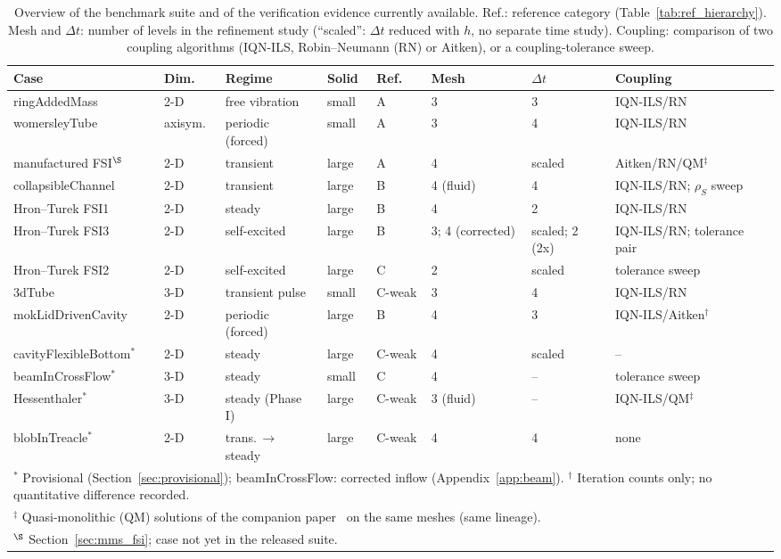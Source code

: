 \begin{table}[htbp]
	\centering
	\footnotesize
	\setlength{\tabcolsep}{3pt}
	\caption{Overview of the benchmark suite and of the verification evidence currently available. Ref.: reference category (Table~\ref{tab:ref_hierarchy}). Mesh and $\Delta t$: number of levels in the refinement study (``scaled'': $\Delta t$ reduced with $h$, no separate time study). Coupling: comparison of two coupling algorithms (IQN-ILS, Robin--Neumann (RN) or Aitken), or a coupling-tolerance sweep.}
	\label{tab:suite_overview}
	\begin{tabular}{llllllll}
		\toprule
		Case & Dim. & Regime & Solid & Ref. & Mesh & $\Delta t$ & Coupling \\
		\midrule
		ringAddedMass & 2-D & free vibration & small & A & 3 & 3 & IQN-ILS/RN \\
		womersleyTube & axisym. & periodic (forced) & small & A & 3 & 4 & IQN-ILS/RN \\
		manufactured FSI$^\S$ & 2-D & transient & large & A & 4 & scaled & Aitken/RN/QM$^\ddagger$ \\
		collapsibleChannel & 2-D & transient & large & B & 4 (fluid) & 4 & IQN-ILS/RN; $\rho_S$ sweep \\
		Hron--Turek FSI1 & 2-D & steady & large & B & 4 & 2 & IQN-ILS/RN \\
		Hron--Turek FSI3 & 2-D & self-excited & large & B & 3; 4 (corrected) & scaled; 2 (2x) & IQN-ILS/RN; tolerance pair \\
		Hron--Turek FSI2 & 2-D & self-excited & large & C & 2 & scaled & tolerance sweep \\
		3dTube & 3-D & transient pulse & small & C-weak & 3 & 4 & IQN-ILS/RN \\
		mokLidDrivenCavity & 2-D & periodic (forced) & large & B & 4 & 3 & IQN-ILS/Aitken$^\dagger$ \\
		cavityFlexibleBottom$^\ast$ & 2-D & steady & large & C-weak & 4 & scaled & -- \\
		beamInCrossFlow$^\ast$ & 3-D & steady & small & C & 4 & -- & tolerance sweep \\
		Hessenthaler$^\ast$ & 3-D & steady (Phase I) & large & C-weak & 3 (fluid) & -- & IQN-ILS/QM$^\ddagger$ \\
		blobInTreacle$^\ast$ & 2-D & trans.\,$\to$\,steady & large & C-weak & 4 & 4 & none \\
		\bottomrule
		\multicolumn{8}{l}{$^\ast$ Provisional (Section~\ref{sec:provisional}); beamInCrossFlow: corrected inflow (Appendix~\ref{app:beam}). $^\dagger$ Iteration counts only; no quantitative difference recorded.} \\
		\multicolumn{8}{l}{$^\ddagger$ Quasi-monolithic (QM) solutions of the companion paper~\citep{CardiffBatistic2026QM} on the same meshes (same lineage).} \\
		\multicolumn{8}{l}{$^\S$ Section~\ref{sec:mms_fsi}; case not yet in the released suite.}
	\end{tabular}
\end{table}

